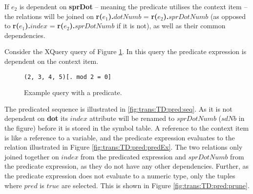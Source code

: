 If $e_2$ is dependent on \textbf{sprDot} -- meaning the predicate utilises the context item -- the relations will
be joined on \textbf{r(}$e_1$\textbf{).}$dotNumb$ \textsf{=} \textbf{r(}$e_2$\textbf{).}$sprDotNumb$ (as opposed
to \textbf{r(}$e_1$\textbf{).}$index$ \textsf{=} \textbf{r(}$e_2$\textbf{).}$sprDotNumb$ if it is not), as well as
their common dependencies.

\begin{myExample}
Consider the XQuery query of Figure \ref{fig:trans:TD:predQu}. In this query the predicate expression is dependent
on the context item.
\begin{figure}[h]
\centering
\verb!(2, 3, 4, 5)[. mod 2 = 0]!
\caption{Example query with a predicate. \label{fig:trans:TD:predQu}}
\end{figure}

The predicated sequence is illustrated in \ref{fig:trans:TD:pred:seq}. As it is not dependent on \textbf{dot} its
$index$ attribute will be renamed to $sprDotNumb$ ($sdNb$ in the figure) before it is stored in the symbol table. A
reference to the context item is like a reference to a variable, and the predicate expression evaluates to the
relation illustrated in Figure \ref{fig:trans:TD:pred:predEx}. The two relations only joined together on $index$
from the predicated expression and $sprDotNumb$ from the predicate expression, as they do not have any other
dependencies. Further, as the predicate expression does not evaluate to a numeric type, only the tuples where
$pred$ is $true$ are selected. This is shown in Figure \ref{fig:trans:TD:pred:prune}.


\end{myExample}
